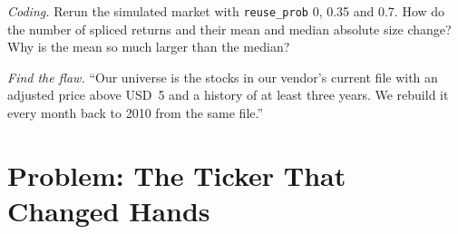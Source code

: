\begin{exercise}[$\star\star\star$]\label{exo:rs:universe-symbology-and-corporate-actions:7}
\emph{Coding.} Rerun the simulated market with \texttt{reuse\_prob} 0, 0.35 and 0.7. How do the number of spliced returns and
their mean and median absolute size change? Why is the mean so much larger than the median?
\end{exercise}

\begin{exercise}[$\star\star\star$]\label{exo:rs:universe-symbology-and-corporate-actions:8}
\emph{Find the flaw.} ``Our universe is the stocks in our vendor's current file with an adjusted price above USD~5 and a history of
at least three years. We rebuild it every month back to 2010 from the same file.''
\end{exercise}

\section{Problem: The Ticker That Changed Hands}


